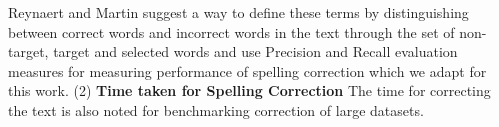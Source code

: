 \documentclass[preprint,11pt]{elsarticle}
\begin{document}
Reynaert and Martin\cite{reynaert2008all} suggest a way to define these terms by distinguishing between correct words and incorrect words in the text through the set of non-target, target and selected words and use Precision and Recall evaluation measures for measuring performance of spelling correction which we adapt for this work. %
(2) \textbf{Time taken for Spelling Correction } The time for correcting the text is also noted for benchmarking correction of large datasets.

\end{document}
